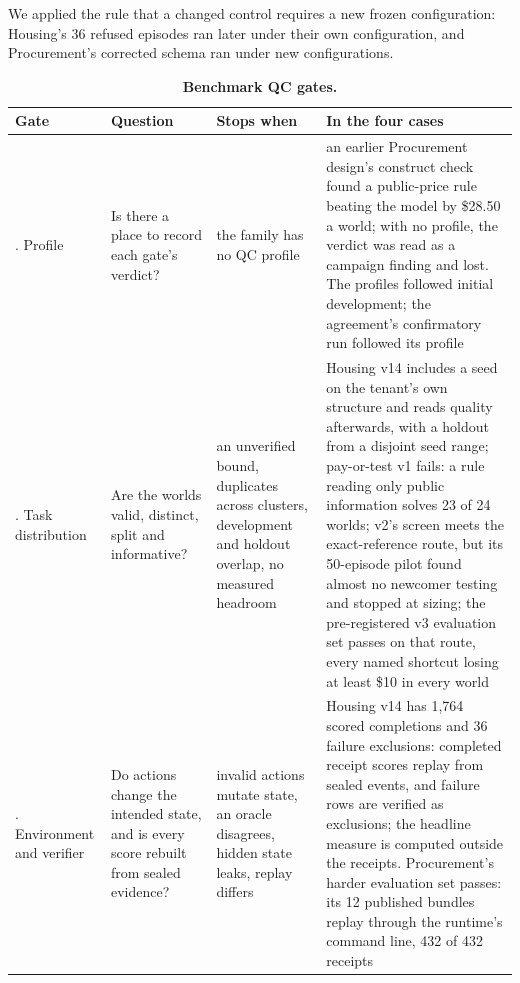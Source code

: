 We applied the rule that a changed control requires a new frozen configuration: Housing's 36 refused episodes ran
later under their own configuration, and Procurement's corrected schema ran under new configurations.

\renewcommand{\thetable}{F.1}
\begin{longtable}[]{@{}
  >{\raggedright\arraybackslash}p{}
  >{\raggedright\arraybackslash}p{}
  >{\raggedright\arraybackslash}p{}
  >{\raggedright\arraybackslash}p{}@{}}
\caption{\textbf{Benchmark QC gates.}}\label{tab:F.1}\tabularnewline
\toprule\noalign{}
\begin{minipage}[b]{\linewidth}\raggedright
Gate
\end{minipage} & \begin{minipage}[b]{\linewidth}\raggedright
Question
\end{minipage} & \begin{minipage}[b]{\linewidth}\raggedright
Stops when
\end{minipage} & \begin{minipage}[b]{\linewidth}\raggedright
In the four cases
\end{minipage} \\
\midrule\noalign{}
\endhead
\bottomrule\noalign{}
\endlastfoot
0. Profile & Is there a place to record each gate's verdict? & the family has no QC profile & an earlier Procurement design's construct check found a public-price rule beating the model by \$28.50 a world; with no profile, the verdict was read as a campaign finding and lost. The profiles followed initial development; the agreement's confirmatory run followed its profile \\
1. Task distribution & Are the worlds valid, distinct, split and informative? & an unverified bound, duplicates across clusters, development and holdout overlap, no measured headroom & Housing v14 includes a seed on the tenant's own structure and reads quality afterwards, with a holdout from a disjoint seed range; pay-or-test v1 fails: a rule reading only public information solves 23 of 24 worlds; v2's screen meets the exact-reference route, but its 50-episode pilot found almost no newcomer testing and stopped at sizing; the pre-registered v3 evaluation set passes on that route, every named shortcut losing at least \$10 in every world \\
2. Environment and verifier & Do actions change the intended state, and is every score rebuilt from sealed evidence? & invalid actions mutate state, an oracle disagrees, hidden state leaks, replay differs & Housing v14 has 1,764 scored completions and 36 failure exclusions: completed receipt scores replay from sealed events, and failure rows are verified as exclusions; the headline measure is computed outside the receipts. Procurement's harder evaluation set passes: its 12 published bundles replay through the runtime's command line, 432 of 432 receipts \\

\end{longtable}
